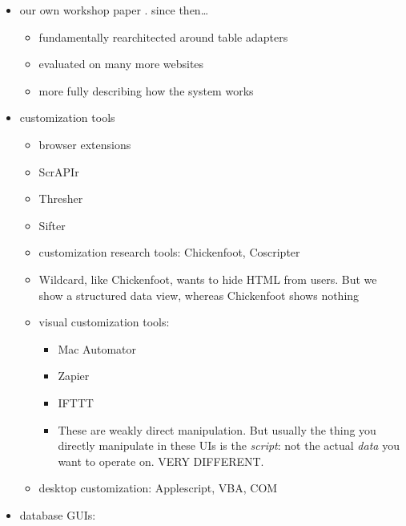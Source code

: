 \documentclass[sigplan,10pt,anonymous,review]{acmart}
\providecommand{\tightlist}{%
  \setlength{\itemsep}{0pt}\setlength{\parskip}{0pt}}
\begin{document}
\begin{itemize}
\tightlist
\item
  our own workshop paper \citep{litt2020}. since then\ldots{}

  \begin{itemize}
  \tightlist
  \item
    fundamentally rearchitected around table adapters
  \item
    evaluated on many more websites
  \item
    more fully describing how the system works
  \end{itemize}
\item
  customization tools

  \begin{itemize}
  \tightlist
  \item
    browser extensions
  \item
    ScrAPIr
  \item
    Thresher
  \item
    Sifter
  \item
    customization research tools: Chickenfoot, Coscripter
  \item
    Wildcard, like Chickenfoot, wants to hide HTML from users. But we
    show a structured data view, whereas Chickenfoot shows nothing
  \item
    visual customization tools:

    \begin{itemize}
    \tightlist
    \item
      Mac Automator
    \item
      Zapier
    \item
      IFTTT
    \item
      These are weakly direct manipulation. But usually the thing you
      directly manipulate in these UIs is the \emph{script}: not the
      actual \emph{data} you want to operate on. VERY DIFFERENT.
    \end{itemize}
  \item
    desktop customization: Applescript, VBA, COM
  \end{itemize}
\item
  database GUIs:


\end{itemize}
\end{document}
